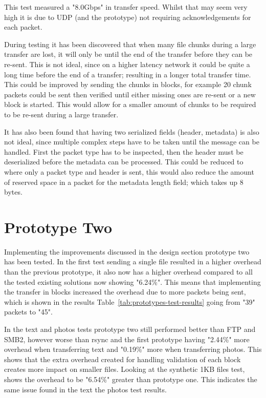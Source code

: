 This test measured a "8.0Gbps" in transfer speed. Whilst that may seem very high it is due to UDP (and the prototype) not requiring acknowledgements for each packet.

During testing it has been discovered that when many file chunks during a large transfer are lost, it will only be until the end of the transfer before they can be re-sent. This is not ideal, since on a higher latency network it could be quite a long time before the end of a transfer; resulting in a longer total transfer time. This could be improved by sending the chunks in blocks, for example 20 chunk packets could be sent then verified until either missing ones are re-sent or a new block is started. This would allow for a smaller amount of chunks to be required to be re-sent during a large transfer.

It has also been found that having two serialized fields (header, metadata) is also not ideal, since multiple complex steps have to be taken until the message can be handled. First the packet type has to be inspected, then the header must be deserialized before the metadata can be processed. This could be reduced to where only a packet type and header is sent, this would also reduce the amount of reserved space in a packet for the metadata length field; which takes up 8 bytes.


\section{Prototype Two}
Implementing the improvements discussed in the design section prototype two has been tested. In the first test sending a single file resulted in a higher overhead than the previous prototype, it also now has a higher overhead compared to all the tested existing solutions now showing "6.24\%". This means that implementing the transfer in blocks increased the overhead due to more packets being sent, which is shown in the results Table~\ref{tab:prototypes-test-results} going from "39" packets to "45".

In the text and photos tests prototype two still performed better than FTP and SMB2, however worse than rsync and the first prototype having "2.44\%" more overhead when transferring text and "0.19\%" more when transferring photos. This shows that the extra overhead created for handling validation of each block creates more impact on smaller files. Looking at the synthetic 1KB files test, shows the overhead to be "6.54\%" greater than prototype one. This indicates the same issue found in the text the photos test results.

